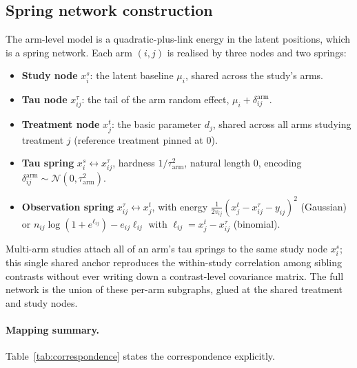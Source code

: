 \documentclass[12pt]{article}
\begin{document}
\subsection{Spring network construction}\label{sec:spring-correspondence}

The arm-level model is a quadratic-plus-link energy in the latent
positions, which is a spring network. Each arm $(i, j)$ is
realised by three nodes and two springs:

\begin{itemize}
\item \textbf{Study node} $x^s_i$: the latent baseline $\mu_i$,
shared across the study's arms.
\item \textbf{Tau node} $x^{\tau}_{ij}$: the tail of the arm
random effect, $\mu_i + \delta^{\text{arm}}_{ij}$.
\item \textbf{Treatment node} $x^t_j$: the basic parameter
$d_j$, shared across all arms studying treatment $j$
(reference treatment pinned at $0$).
\item \textbf{Tau spring}
$x^s_i \leftrightarrow x^{\tau}_{ij}$, hardness
$1/\tau^2_{\text{arm}}$, natural length $0$, encoding
$\delta^{\text{arm}}_{ij} \sim \mathcal{N}(0, \tau^2_{\text{arm}})$.
\item \textbf{Observation spring}
$x^{\tau}_{ij} \leftrightarrow x^t_j$, with energy
$\tfrac{1}{2 v_{ij}}(x^t_j - x^{\tau}_{ij} - y_{ij})^2$
(Gaussian) or
$n_{ij}\log(1 + e^{\ell_{ij}}) - e_{ij}\ell_{ij}$ with
$\ell_{ij} = x^t_j - x^{\tau}_{ij}$ (binomial).
\end{itemize}

Multi-arm studies attach all of an arm's tau springs to the same
study node $x^s_i$; this single shared anchor reproduces the
within-study correlation among sibling contrasts without ever
writing down a contrast-level covariance matrix. The full
network is the union of these per-arm subgraphs, glued at the
shared treatment and study nodes.

\paragraph{Mapping summary.} Table~\ref{tab:correspondence}
states the correspondence explicitly.
\end{document}
